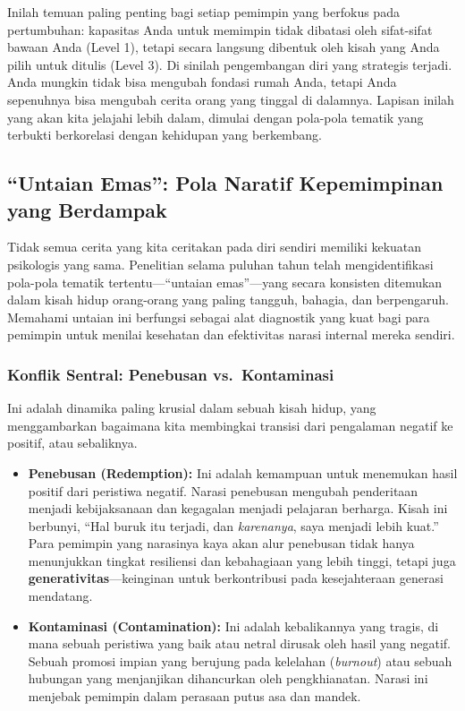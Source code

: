 \documentclass[
  letterpaper,
  DIV=11,
  numbers=noendperiod]{scrreprt}
\begin{document}
Inilah temuan paling penting bagi setiap pemimpin yang berfokus pada
pertumbuhan: kapasitas Anda untuk memimpin tidak dibatasi oleh
sifat-sifat bawaan Anda (Level 1), tetapi secara langsung dibentuk oleh
kisah yang Anda pilih untuk ditulis (Level 3). Di sinilah pengembangan
diri yang strategis terjadi. Anda mungkin tidak bisa mengubah fondasi
rumah Anda, tetapi Anda sepenuhnya bisa mengubah cerita orang yang
tinggal di dalamnya. Lapisan inilah yang akan kita jelajahi lebih dalam,
dimulai dengan pola-pola tematik yang terbukti berkorelasi dengan
kehidupan yang berkembang.

\subsection{``Untaian Emas'': Pola Naratif Kepemimpinan yang
Berdampak}\label{untaian-emas-pola-naratif-kepemimpinan-yang-berdampak}

Tidak semua cerita yang kita ceritakan pada diri sendiri memiliki
kekuatan psikologis yang sama. Penelitian selama puluhan tahun telah
mengidentifikasi pola-pola tematik tertentu---``untaian emas''---yang
secara konsisten ditemukan dalam kisah hidup orang-orang yang paling
tangguh, bahagia, dan berpengaruh. Memahami untaian ini berfungsi
sebagai alat diagnostik yang kuat bagi para pemimpin untuk menilai
kesehatan dan efektivitas narasi internal mereka sendiri.

\subsubsection{Konflik Sentral: Penebusan
vs.~Kontaminasi}\label{konflik-sentral-penebusan-vs.-kontaminasi}

Ini adalah dinamika paling krusial dalam sebuah kisah hidup, yang
menggambarkan bagaimana kita membingkai transisi dari pengalaman negatif
ke positif, atau sebaliknya.

\begin{itemize}
\item
  \textbf{Penebusan (Redemption):} Ini adalah kemampuan untuk menemukan
  hasil positif dari peristiwa negatif. Narasi penebusan mengubah
  penderitaan menjadi kebijaksanaan dan kegagalan menjadi pelajaran
  berharga. Kisah ini berbunyi, ``Hal buruk itu terjadi, dan
  \emph{karenanya}, saya menjadi lebih kuat.'' Para pemimpin yang
  narasinya kaya akan alur penebusan tidak hanya menunjukkan tingkat
  resiliensi dan kebahagiaan yang lebih tinggi, tetapi juga
  \textbf{generativitas}---keinginan untuk berkontribusi pada
  kesejahteraan generasi mendatang.
\item
  \textbf{Kontaminasi (Contamination):} Ini adalah kebalikannya yang
  tragis, di mana sebuah peristiwa yang baik atau netral dirusak oleh
  hasil yang negatif. Sebuah promosi impian yang berujung pada kelelahan
  (\emph{burnout}) atau sebuah hubungan yang menjanjikan dihancurkan
  oleh pengkhianatan. Narasi ini menjebak pemimpin dalam perasaan putus
  asa dan mandek.
\end{itemize}
\end{document}

